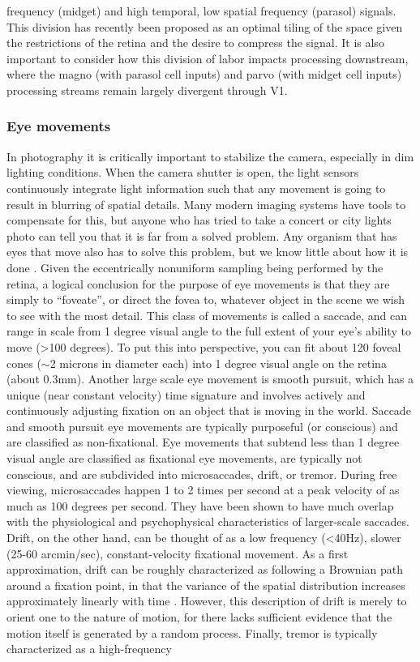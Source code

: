 frequency (midget) and high temporal, low spatial frequency (parasol) signals. This division has recently been proposed as an optimal tiling of the space given the restrictions of the retina \parencite{mcintosh2016deep} and the desire to compress the signal. It is also important to consider how this division of labor impacts processing downstream, where the magno (with parasol cell inputs) and parvo (with midget cell inputs) processing streams remain largely divergent through V1.

\subsubsection{Eye movements}
In photography it is critically important to stabilize the camera, especially in dim lighting conditions. When the camera shutter is open, the light sensors continuously integrate light information such that any movement is going to result in blurring of spatial details. Many modern imaging systems have tools to compensate for this, but anyone who has tried to take a concert or city lights photo can tell you that it is far from a solved problem. Any organism that has eyes that move also has to solve this problem, but we know little about how it is done \parencite{olshausen2010does, burak2010bayesian}. Given the eccentrically nonuniform sampling being performed by the retina, a logical conclusion for the purpose of eye movements is that they are simply to “foveate”, or direct the fovea to, whatever object in the scene we wish to see with the most detail. This class of movements is called a saccade, and can range in scale from 1 degree visual angle to the full extent of your eye’s ability to move (\textgreater 100 degrees). To put this into perspective, you can fit about 120 foveal cones ($\sim$2 microns in diameter each) into 1 degree visual angle on the retina (about 0.3mm). Another large scale eye movement is smooth pursuit, which has a unique (near constant velocity) time signature and involves actively and continuously adjusting fixation on an object that is moving in the world. Saccade and smooth pursuit eye movements are typically purposeful (or conscious) and are classified as non-fixational. Eye movements that subtend less than 1 degree visual angle are classified as fixational eye movements, are typically not conscious, and are subdivided into microsaccades, drift, or tremor. During free viewing, microsaccades happen 1 to 2  times per second at a peak velocity of as much as 100 degrees per second. They have been shown to have much overlap with the physiological and psychophysical characteristics of larger-scale saccades. Drift, on the other hand, can be thought of as a low frequency (\textless 40Hz), slower (25-60 arcmin/sec), constant-velocity fixational movement. As a first approximation, drift can be roughly characterized as following a Brownian path around a fixation point, in that the variance of the spatial distribution increases approximately linearly with time \parencite{rucci2015unsteady}. However, this description of drift is merely to orient one to the nature of motion, for there lacks sufficient evidence that the motion itself is generated by a random process. Finally, tremor is typically characterized as a high-frequency 